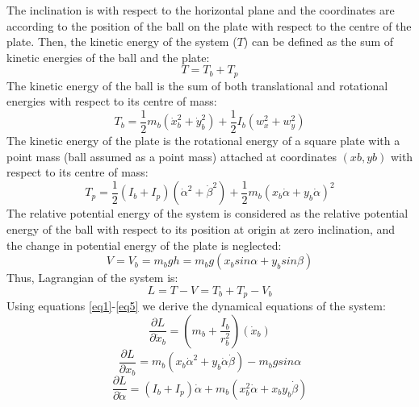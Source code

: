 \documentclass[conference]{IEEEtran}
\begin{document}
The inclination is with respect to the horizontal plane and the coordinates are according to the position of the ball on the plate with respect to the centre of the plate.
Then, the kinetic energy of the system ($T$) can be defined as the sum of kinetic energies of the ball and the plate: 
\begin{equation}
T = T_{b} + T_{p}\label{eq2}
\end{equation}
The kinetic energy of the ball is the sum of both translational and rotational energies with respect to its centre of mass:
\begin{equation}
T_{b} = \frac{1}{2} m_{b} \left( \dot x_{b}^{2} + \dot y_{b}^{2} \right) +  \frac{1}{2} I_{b} \left(w_{x}^{2} + w_{y}^{2} \right)\label{eq3}
\end{equation}
The kinetic energy of the plate is the rotational energy of a square plate with a point mass (ball assumed as a point mass) attached at coordinates $(xb, yb)$ with respect to its centre of mass:
\begin{equation}
T_{p} = \frac{1}{2} \left(I_{b} + I_{p}\right) (\dot \alpha^{2} + \dot \beta^{2} ) + \frac{1}{2} m_{b} ( x_{b} \dot \alpha + y_{b}\dot \alpha )^{2}\label{eq4}
\end{equation}
The relative potential energy of the system is considered as the relative potential energy of the ball with respect to its position at origin at zero inclination, and the change in potential energy of the plate is neglected:
\begin{equation}
V = V_{b} = m_{b} g h = m_{b} g \left( x_{b}sin\alpha + y_{b}sin\beta\right)\label{eq5}
\end{equation}
Thus, Lagrangian of the system is:
\begin{equation}
L = T - V = T_{b} + T_{p} - V_{b}\label{eq6}
\end{equation}
Using equations \ref{eq1}-\ref{eq5} we derive the dynamical equations of the system: 
\begin{equation}
\frac{\partial L}{\partial \dot x_{b}} =  \left( m_{b} + \frac{I_{b}}{r_{b}^{2}} \right) (\dot x_{b})
\label{eq7}\end{equation}
\begin{equation}
\frac{\partial L}{\partial x_{b}} = m_{b}(x_{b}\dot\alpha^{2} + y_{b}\dot\alpha\dot\beta) - m_{b}gsin\alpha
\label{eq8}\end{equation}
\begin{equation}
\frac{\partial L}{\partial \dot \alpha} = (I_{b} + I_{p})\dot\alpha + m_{b}(x_{b}^{2}\dot\alpha + x_{b}y_{b}\dot\beta)
\label{eq9}\end{equation}
\end{document}
